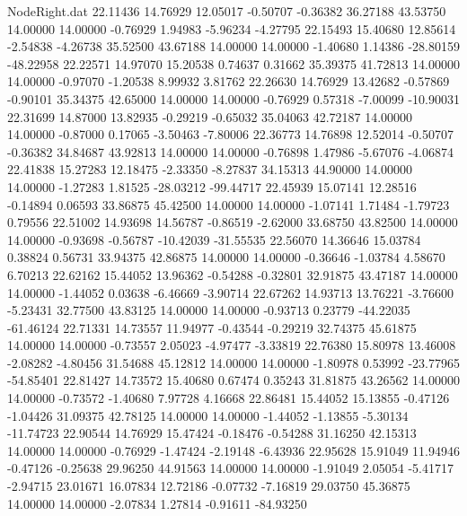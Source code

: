 \begin{filecontents}{NodeRight.dat}
  22.11436   14.76929   12.05017    -0.50707   -0.36382   36.27188   43.53750   14.00000   14.00000   -0.76929    1.94983   -5.96234   -4.27795
  22.15493   15.40680   12.85614    -2.54838   -4.26738   35.52500   43.67188   14.00000   14.00000   -1.40680    1.14386  -28.80159  -48.22958
  22.22571   14.97070   15.20538     0.74637    0.31662   35.39375   41.72813   14.00000   14.00000   -0.97070   -1.20538    8.99932    3.81762
  22.26630   14.76929   13.42682    -0.57869   -0.90101   35.34375   42.65000   14.00000   14.00000   -0.76929    0.57318   -7.00099  -10.90031
  22.31699   14.87000   13.82935    -0.29219   -0.65032   35.04063   42.72187   14.00000   14.00000   -0.87000    0.17065   -3.50463   -7.80006
  22.36773   14.76898   12.52014    -0.50707   -0.36382   34.84687   43.92813   14.00000   14.00000   -0.76898    1.47986   -5.67076   -4.06874
  22.41838   15.27283   12.18475    -2.33350   -8.27837   34.15313   44.90000   14.00000   14.00000   -1.27283    1.81525  -28.03212  -99.44717
  22.45939   15.07141   12.28516    -0.14894    0.06593   33.86875   45.42500   14.00000   14.00000   -1.07141    1.71484   -1.79723    0.79556
  22.51002   14.93698   14.56787    -0.86519   -2.62000   33.68750   43.82500   14.00000   14.00000   -0.93698   -0.56787  -10.42039  -31.55535
  22.56070   14.36646   15.03784     0.38824    0.56731   33.94375   42.86875   14.00000   14.00000   -0.36646   -1.03784    4.58670    6.70213
  22.62162   15.44052   13.96362    -0.54288   -0.32801   32.91875   43.47187   14.00000   14.00000   -1.44052    0.03638   -6.46669   -3.90714
  22.67262   14.93713   13.76221    -3.76600   -5.23431   32.77500   43.83125   14.00000   14.00000   -0.93713    0.23779  -44.22035  -61.46124
  22.71331   14.73557   11.94977    -0.43544   -0.29219   32.74375   45.61875   14.00000   14.00000   -0.73557    2.05023   -4.97477   -3.33819
  22.76380   15.80978   13.46008    -2.08282   -4.80456   31.54688   45.12812   14.00000   14.00000   -1.80978    0.53992  -23.77965  -54.85401
  22.81427   14.73572   15.40680     0.67474    0.35243   31.81875   43.26562   14.00000   14.00000   -0.73572   -1.40680    7.97728    4.16668
  22.86481   15.44052   15.13855    -0.47126   -1.04426   31.09375   42.78125   14.00000   14.00000   -1.44052   -1.13855   -5.30134  -11.74723
  22.90544   14.76929   15.47424    -0.18476   -0.54288   31.16250   42.15313   14.00000   14.00000   -0.76929   -1.47424   -2.19148   -6.43936
  22.95628   15.91049   11.94946    -0.47126   -0.25638   29.96250   44.91563   14.00000   14.00000   -1.91049    2.05054   -5.41717   -2.94715
  23.01671   16.07834   12.72186    -0.07732   -7.16819   29.03750   45.36875   14.00000   14.00000   -2.07834    1.27814   -0.91611  -84.93250

\end{filecontents}

